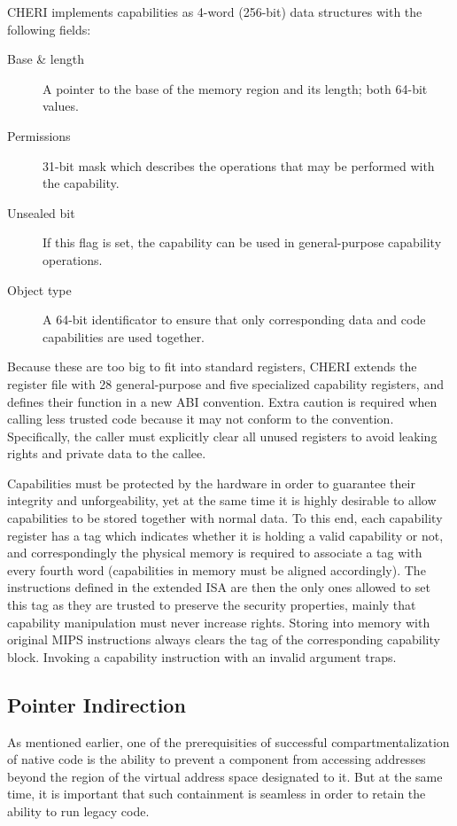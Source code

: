 \documentclass[a4paper,12pt,twoside,openright]{report}
\begin{document}
CHERI implements capabilities as 4-word (256-bit) data structures with the following fields:
\begin{description}
	\item[Base \& length] A pointer to the base of the memory region and its length; both 64-bit values.
	\item[Permissions] 31-bit mask which describes the operations that may be performed with the capability.
	\item[Unsealed bit] If this flag is set, the capability can be used in general-purpose capability operations.
	\item[Object type] A 64-bit identificator to ensure that only corresponding data and code capabilities are used together.
\end{description}

Because these are too big to fit into standard registers, CHERI extends the register file with 28 general-purpose and five specialized capability registers, and defines their function in a new ABI convention. Extra caution is required when calling less trusted code because it may not conform to the convention. Specifically, the caller must explicitly clear all unused registers to avoid leaking rights and private data to the callee.

Capabilities must be protected by the hardware in order to guarantee their integrity and unforgeability, yet at the same time it is highly desirable to allow capabilities to be stored together with normal data. To this end, each capability register has a tag which indicates whether it is holding a valid capability or not, and correspondingly the physical memory is required to associate a tag with every fourth word (capabilities in memory must be aligned accordingly). The instructions defined in the extended ISA are then the only ones allowed to set this tag as they are trusted to preserve the security properties, mainly that capability manipulation must never increase rights. Storing into memory with original MIPS instructions always clears the tag of the corresponding capability block. Invoking a capability instruction with an invalid argument traps.

\subsection{Pointer Indirection}

As mentioned earlier, one of the prerequisities of successful compartmentalization of native code is the ability to prevent a component from accessing addresses beyond the region of the virtual address space designated to it. But at the same time, it is important that such containment is seamless in order to retain the ability to run legacy code.
\end{document}
